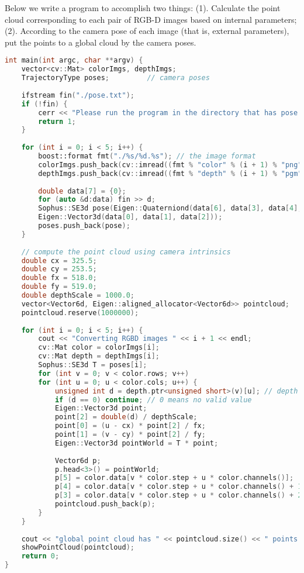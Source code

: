 Below we write a program to accomplish two things: (1). Calculate the point cloud corresponding to each pair of RGB-D images based on internal parameters; (2). According to the camera pose of each image (that is, external parameters), put the points to a global cloud by the camera poses.

\begin{lstlisting}[language=C++,caption=slambook/ch5/rgbd/jointMap.cpp (Part)]
int main(int argc, char **argv) {
    vector<cv::Mat> colorImgs, depthImgs;
    TrajectoryType poses;         // camera poses
    
    ifstream fin("./pose.txt");
    if (!fin) {
        cerr << "Please run the program in the directory that has pose.txt" << endl;
        return 1;
    }
    
    for (int i = 0; i < 5; i++) {
        boost::format fmt("./%s/%d.%s"); // the image format
        colorImgs.push_back(cv::imread((fmt % "color" % (i + 1) % "png").str()));
        depthImgs.push_back(cv::imread((fmt % "depth" % (i + 1) % "pgm").str(), -1)); // use -1 flag to load the depth image
        
        double data[7] = {0};
        for (auto &d:data) fin >> d;
        Sophus::SE3d pose(Eigen::Quaterniond(data[6], data[3], data[4], data[5]),
        Eigen::Vector3d(data[0], data[1], data[2]));
        poses.push_back(pose);
    }
    
    // compute the point cloud using camera intrinsics
    double cx = 325.5;
    double cy = 253.5;
    double fx = 518.0;
    double fy = 519.0;
    double depthScale = 1000.0;
    vector<Vector6d, Eigen::aligned_allocator<Vector6d>> pointcloud;
    pointcloud.reserve(1000000);
    
    for (int i = 0; i < 5; i++) {
        cout << "Converting RGBD images " << i + 1 << endl;
        cv::Mat color = colorImgs[i];
        cv::Mat depth = depthImgs[i];
        Sophus::SE3d T = poses[i];
        for (int v = 0; v < color.rows; v++)
        for (int u = 0; u < color.cols; u++) {
            unsigned int d = depth.ptr<unsigned short>(v)[u]; // depth value is 16-bit
            if (d == 0) continue; // 0 means no valid value
            Eigen::Vector3d point;
            point[2] = double(d) / depthScale;
            point[0] = (u - cx) * point[2] / fx;
            point[1] = (v - cy) * point[2] / fy;
            Eigen::Vector3d pointWorld = T * point;
            
            Vector6d p;
            p.head<3>() = pointWorld;
            p[5] = color.data[v * color.step + u * color.channels()];   // blue
            p[4] = color.data[v * color.step + u * color.channels() + 1]; // green
            p[3] = color.data[v * color.step + u * color.channels() + 2]; // red
            pointcloud.push_back(p);
        }
    }
    
    cout << "global point cloud has " << pointcloud.size() << " points." << endl;
    showPointCloud(pointcloud);
    return 0;
}
\end{lstlisting}

